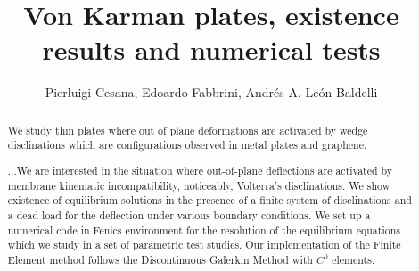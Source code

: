 \documentclass[8pt]{article}
\title{Von Karman plates, existence results and numerical tests}
\author{Pierluigi Cesana, Edoardo Fabbrini, Andrés A. León Baldelli}
\begin{document}
\ifpdf
{}
\else
{}
\fi

\maketitle


\begin{abstract}
We study thin plates where out of plane deformations are activated by wedge disclinations which are configurations observed    in metal plates and graphene.

...We are interested in the situation where out-of-plane deflections are activated by membrane kinematic incompatibility,
noticeably, Volterra's disclinations. We show existence of equilibrium solutions in the presence of a finite system of disclinations and a dead load for the deflection under various boundary conditions. We set up a numerical code in Fenics environment for the resolution of the equilibrium equations which we study in a set of parametric test studies. Our implementation of the Finite Element method follows the Discontinuous Galerkin Method with $C^0$ elements.
 \end{abstract}

\tableofcontents




% 
\end{document}
